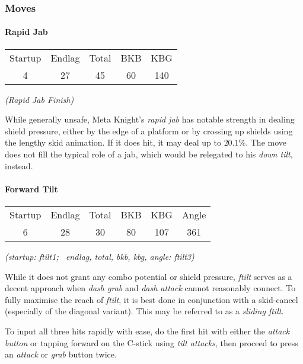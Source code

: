 \subsubsection{Moves} \label{ult-metaknight-moves}

\paragraph[Jab]{Rapid Jab}
\begin{center}
	\begin{tabular}{| c  c  c | c  c |}
		\hline
		Startup	& Endlag & Total & BKB & KBG \\
		4	&	27	&	45	&	60	&	140	\\
		\hline
	\end{tabular}
	
	\emph{(Rapid Jab Finish)}
\end{center}

While generally unsafe, Meta Knight's \emph{rapid jab} has notable strength in dealing shield pressure, either by the edge of a platform or by crossing up shields using the lengthy skid animation. If it does hit, it may deal up to $20.1\%$. The move does not fill the typical role of a jab, which would be relegated to his \textit{down tilt}, instead.

\paragraph{Forward Tilt}

\begin{center}
	\begin{tabular}{| c  c  c | c  c  c |}
		\hline
		Startup	& Endlag & Total & BKB & KBG & Angle \\
		6	&	28	&	30	&	80	&	107	& 361\deg \\
		\hline
	\end{tabular}
	
	\emph{(startup: ftilt1; \ endlag, total, bkb, kbg, angle: ftilt3)}
\end{center}

While it does not grant any combo potential or shield pressure, \textit{ftilt} serves as a decent approach when \textit{dash grab} and \textit{dash attack} cannot reasonably connect. To fully maximise the reach of \textit{ftilt}, it is best done in conjunction with a skid-cancel (especially of the diagonal variant). This may be referred to as a \textit{sliding ftilt}.

To input all three hits rapidly with ease, do the first hit with either the \textit{attack button} or tapping forward on the C-stick using \textit{tilt attacks}, then proceed to press an \textit{attack} or \textit{grab} button twice.

